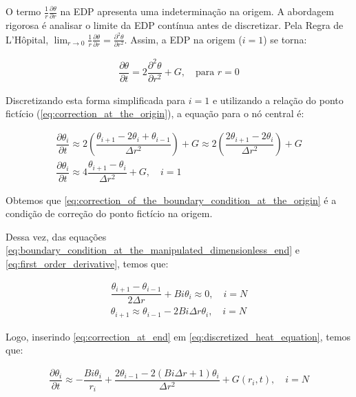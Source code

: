 O termo $\frac{1}{r}\frac{\partial \theta}{\partial r}$ na EDP apresenta uma indeterminação na origem. A abordagem rigorosa é analisar o limite da EDP contínua antes de discretizar. Pela Regra de L'Hôpital, $\lim_{r \to 0} \frac{1}{r}\frac{\partial \theta}{\partial r} = \frac{\partial^2 \theta}{\partial r^2}$. Assim, a EDP na origem ($i=1$) se torna:

\begin{gather}
\dfrac{\partial \theta}{\partial t} = 2 \dfrac{\partial ^2 \theta}{\partial r ^2} + G, \quad \text{para } r=0
\end{gather}

Discretizando esta forma simplificada para $i=1$ e utilizando a relação do ponto fictício (\ref{eq:correction_at_the_origin}), a equação para o nó central é:

\begin{gather} 
\dfrac{\partial \theta _i}{\partial t} \approx 2 \left( \dfrac{\theta_{i+1} - 2\theta_i + \theta_{i-1}}{\Delta r^2} \right) + G \approx 2 \left( \dfrac{2\theta_{i+1} - 2\theta_i}{\Delta r^2} \right) + G \\
\dfrac{\partial \theta _i}{\partial t} \approx 4 \dfrac{\theta _{i+1} - \theta _i}{\Delta r^2} + G, \quad i = 1
\label{eq:correction_of_the_boundary_condition_at_the_origin} 
\end{gather} 

Obtemos que \ref{eq:correction_of_the_boundary_condition_at_the_origin} é a condição de correção do ponto fictício na origem. 

Dessa vez, das equações \ref{eq:boundary_condition_at_the_manipulated_dimensionless_end} e \ref{eq:first_order_derivative}, temos que: 

\begin{gather} 
\dfrac{\theta _{i+1} - \theta _{i-1}}{2 \Delta r} + Bi \theta _i \approx 0, \quad i = N \\ 
\theta _{i+1} \approx \theta _{i-1} - 2 Bi \Delta r \theta _i, \quad i = N 
\label{eq:correction_at_end} 
\end{gather} 

Logo, inserindo \ref{eq:correction_at_end} em \ref{eq:discretized_heat_equation}, temos que: 

\begin{gather} 
\dfrac{\partial \theta _i}{\partial t} \approx - \dfrac{Bi \theta _i}{r_i} + \dfrac{2 \theta _{i-1} - 2 (Bi \Delta r + 1) \theta _i}{\Delta r^2} + G(r_i,t), \quad i = N
\label{eq:correction_of_the_boundary_condition_at_end} 
\end{gather} 

